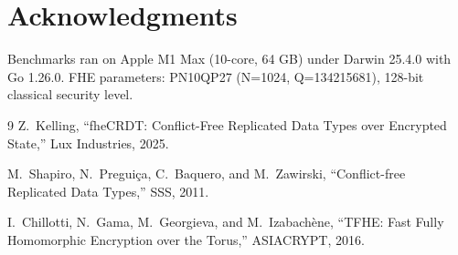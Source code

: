 \documentclass{../shared/luxfhe}
\begin{document}
\section*{Acknowledgments}

Benchmarks ran on Apple M1 Max (10-core, 64 GB) under Darwin 25.4.0
with Go 1.26.0.  FHE parameters: PN10QP27 (N=1024, Q=134215681),
128-bit classical security level.

\begin{thebibliography}{9}
Z.~Kelling, ``fheCRDT: Conflict-Free Replicated Data Types over
Encrypted State,'' Lux Industries, 2025.

M.~Shapiro, N.~Pregui\c{c}a, C.~Baquero, and M.~Zawirski,
``Conflict-free Replicated Data Types,'' SSS, 2011.

I.~Chillotti, N.~Gama, M.~Georgieva, and M.~Izabach\`ene,
``TFHE: Fast Fully Homomorphic Encryption over the Torus,''
ASIACRYPT, 2016.
\end{thebibliography}
\end{document}
